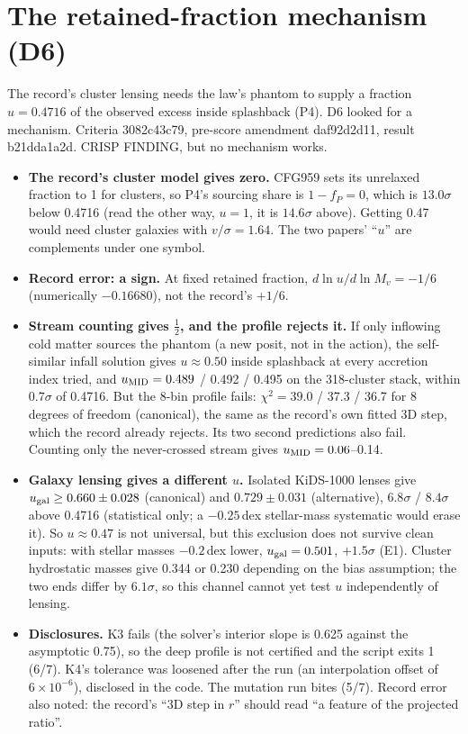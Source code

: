 \documentclass[10pt]{article}
\begin{document}
\section{The retained-fraction mechanism (D6)}
The record's cluster lensing needs the law's phantom to supply a fraction $u=0.4716$ of the observed excess inside splashback (P4). D6 looked for a mechanism. Criteria 3082c43c79, pre-score amendment daf92d2d11, result b21dda1a2d. CRISP FINDING, but no mechanism works.
\begin{itemize}
\item \textbf{The record's cluster model gives zero.} CFG959 sets its unrelaxed fraction to 1 for clusters, so P4's sourcing share is $1-f_P=0$, which is $13.0\sigma$ below 0.4716 (read the other way, $u=1$, it is $14.6\sigma$ above). Getting 0.47 would need cluster galaxies with $v/\sigma=1.64$. The two papers' ``$u$'' are complements under one symbol.
\item \textbf{Record error: a sign.} At fixed retained fraction, $d\ln u/d\ln M_v=-1/6$ (numerically $-0.16680$), not the record's $+1/6$.
\item \textbf{Stream counting gives $\tfrac12$, and the profile rejects it.} If only inflowing cold matter sources the phantom (a new posit, not in the action), the self-similar infall solution gives $u\approx0.50$ inside splashback at every accretion index tried, and $u_{\rm MID}=0.489$ / 0.492 / 0.495 on the 318-cluster stack, within $0.7\sigma$ of 0.4716. But the 8-bin profile fails: $\chi^2=39.0$ / 37.3 / 36.7 for 8 degrees of freedom (canonical), the same as the record's own fitted 3D step, which the record already rejects. Its two second predictions also fail. Counting only the never-crossed stream gives $u_{\rm MID}=0.06$--0.14.
\item \textbf{Galaxy lensing gives a different $u$.} Isolated KiDS-1000 lenses give $u_{\rm gal}\ge0.660\pm0.028$ (canonical) and $0.729\pm0.031$ (alternative), $6.8\sigma$ / $8.4\sigma$ above 0.4716 (statistical only; a $-0.25$\,dex stellar-mass systematic would erase it). So $u\approx0.47$ is not universal, but this exclusion does not survive clean inputs: with stellar masses $-0.2$\,dex lower, $u_{\rm gal}=0.501$, $+1.5\sigma$ (E1). Cluster hydrostatic masses give 0.344 or 0.230 depending on the bias assumption; the two ends differ by $6.1\sigma$, so this channel cannot yet test $u$ independently of lensing.
\item \textbf{Disclosures.} K3 fails (the solver's interior slope is 0.625 against the asymptotic 0.75), so the deep profile is not certified and the script exits 1 (6/7). K4's tolerance was loosened after the run (an interpolation offset of $6\times10^{-6}$), disclosed in the code. The mutation run bites (5/7). Record error also noted: the record's ``3D step in $r$'' should read ``a feature of the projected ratio''.
\end{itemize}
\end{document}
